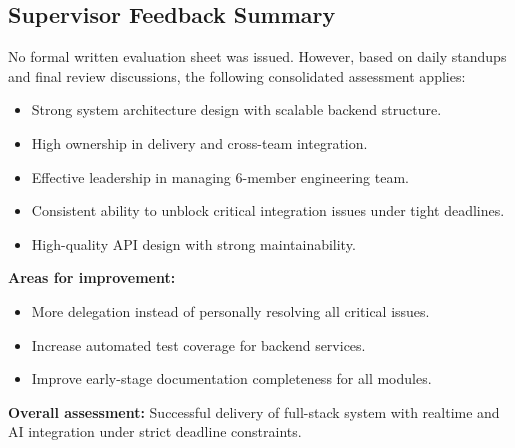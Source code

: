 \subsection{Supervisor Feedback Summary}

No formal written evaluation sheet was issued. However, based on daily standups and final review discussions, the following consolidated assessment applies:

\begin{itemize}
\item Strong system architecture design with scalable backend structure.
\item High ownership in delivery and cross-team integration.
\item Effective leadership in managing 6-member engineering team.
\item Consistent ability to unblock critical integration issues under tight deadlines.
\item High-quality API design with strong maintainability.
\end{itemize}

\textbf{Areas for improvement:}
\begin{itemize}
\item More delegation instead of personally resolving all critical issues.
\item Increase automated test coverage for backend services.
\item Improve early-stage documentation completeness for all modules.
\end{itemize}

\textbf{Overall assessment:} Successful delivery of full-stack system with realtime and AI integration under strict deadline constraints.
